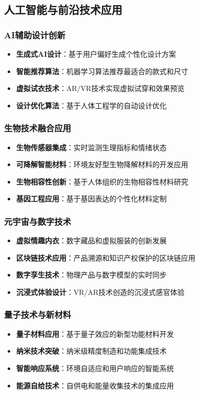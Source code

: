 \documentclass[12pt,UTF8]{ctexbook}
\begin{document}
\subsection{人工智能与前沿技术应用}
\subsubsection{AI辅助设计创新}
\begin{itemize}[leftmargin=2cm]
	\item \textbf{生成式AI设计}：基于用户偏好生成个性化设计方案
	\item \textbf{智能推荐算法}：机器学习算法推荐最适合的款式和尺寸
	\item \textbf{虚拟试衣技术}：AR/VR技术实现虚拟试穿和效果预览
	\item \textbf{设计优化算法}：基于人体工程学的自动设计优化
\end{itemize}

\subsubsection{生物技术融合应用}
\begin{itemize}[leftmargin=2cm]
	\item \textbf{生物传感器集成}：实时监测生理指标和情绪状态
	\item \textbf{可降解智能材料}：环境友好型生物降解材料的开发应用
	\item \textbf{生物相容性创新}：基于人体组织的生物相容性材料研究
	\item \textbf{基因工程应用}：基于基因表达的个性化材料定制
\end{itemize}

\subsubsection{元宇宙与数字技术}
\begin{itemize}[leftmargin=2cm]
	\item \textbf{虚拟情趣内衣}：数字藏品和虚拟服装的创新发展
	\item \textbf{区块链技术应用}：产品溯源和知识产权保护的区块链应用
	\item \textbf{数字孪生技术}：物理产品与数字模型的实时同步
	\item \textbf{沉浸式体验设计}：VR/AR技术创造的沉浸式感官体验
\end{itemize}

\subsubsection{量子技术与新材料}
\begin{itemize}[leftmargin=2cm]
	\item \textbf{量子材料应用}：基于量子效应的新型功能材料开发
	\item \textbf{纳米技术突破}：纳米级精度制造和功能集成技术
	\item \textbf{智能响应系统}：环境自适应和用户响应的智能系统
	\item \textbf{能源自给技术}：自供电和能量收集技术的集成应用
\end{itemize}
\end{document}
